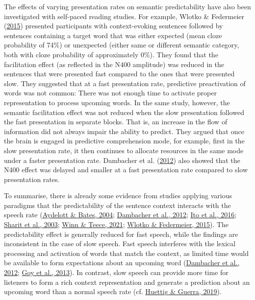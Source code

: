 \documentclass[a4paper, nobind]{templates/ociamthesis}
\begin{document}
The effects of varying presentation rates on semantic predictability have also been investigated with self-paced reading studies.
For example, Wlotko \& Federmeier (\protect\hyperlink{ref-Wlotko2015}{2015}) presented participants with context-evoking sentences followed by sentences containing a target word that was either expected (mean cloze probability of 74\%) or unexpected (either same or different semantic category, both with cloze probability of approximately 0\%).
They found that the facilitation effect (as reflected in the N400 amplitude) was reduced in the sentences that were presented fast compared to the ones that were presented slow.
They suggested that at a fast presentation rate, predictive preactivation of words was not common:
There was not enough time to activate proper representation to process upcoming words.
In the same study, however, the semantic facilitation effect was not reduced when the slow presentation followed the fast presentation in separate blocks.
That is, an increase in the flow of information did not always impair the ability to predict.
They argued that once the brain is engaged in predictive comprehension mode, for example, first in the slow presentation rate, it then continues to allocate resources in the same mode under a faster presentation rate.
Dambacher et al. (\protect\hyperlink{ref-Dambacher2012}{2012}) also showed that the N400 effect was delayed and smaller at a fast presentation rate compared to slow presentation rates.

To summarise, there is already some evidence from studies applying various paradigms that the predictability of the sentence context interacts with the speech rate (\protect\hyperlink{ref-Aydelott2004}{Aydelott \& Bates, 2004}; \protect\hyperlink{ref-Dambacher2012}{Dambacher et al., 2012}; \protect\hyperlink{ref-Ito2016}{Ito et al., 2016}; \protect\hyperlink{ref-Sharit2003}{Sharit et al., 2003}; \protect\hyperlink{ref-Winn2021}{Winn \& Teece, 2021}; \protect\hyperlink{ref-Wlotko2015}{Wlotko \& Federmeier, 2015}).
The predictability effect is generally reduced for fast speech, while the findings are inconsistent in the case of slow speech. Fast speech interferes with the lexical processing and activation of words that match the context, as limited time would be available to form expectations about an upcoming word (\protect\hyperlink{ref-Dambacher2012}{Dambacher et al., 2012}; \protect\hyperlink{ref-Goy2013}{Goy et al., 2013}).
In contrast, slow speech can provide more time for listeners to form a rich context representation and generate a prediction about an upcoming word than a normal speech rate (cf. \protect\hyperlink{ref-Huettig2019}{Huettig \& Guerra, 2019}).
\end{document}

